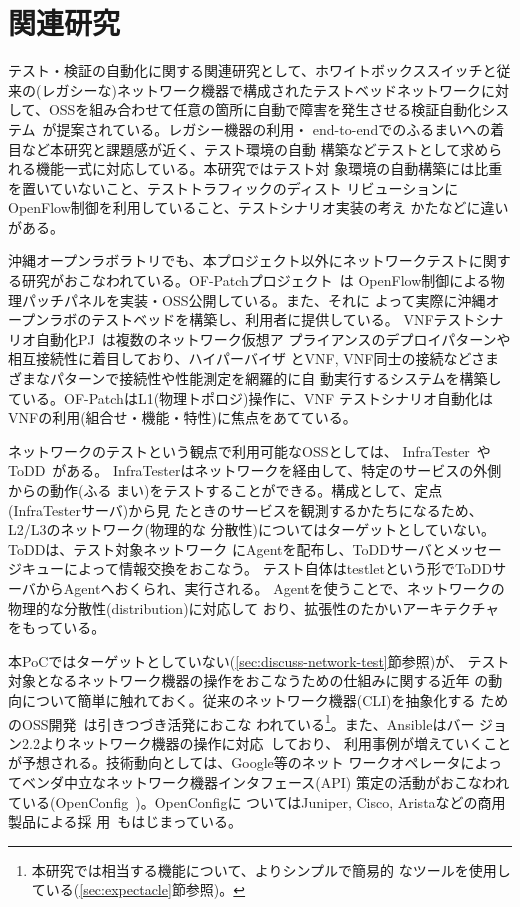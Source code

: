  \section{関連研究}
 \label{sec:related-research}

テスト・検証の自動化に関する関連研究として、ホワイトボックススイッチと従
来の(レガシーな)ネットワーク機器で構成されたテストベッドネットワークに対
して、OSSを組み合わせて任意の箇所に自動で障害を発生させる検証自動化シス
テム~\cite{wbsw-oss-test-automation}が提案されている。レガシー機器の利用・
end-to-endでのふるまいへの着目など本研究と課題感が近く、テスト環境の自動
構築などテストとして求められる機能一式に対応している。本研究ではテスト対
象環境の自動構築には比重を置いていないこと、テストトラフィックのディスト
リビューションにOpenFlow制御を利用していること、テストシナリオ実装の考え
かたなどに違いがある。

沖縄オープンラボラトリでも、本プロジェクト以外にネットワークテストに関す
る研究がおこなわれている。OF-Patchプロジェクト~\cite{ool-testbedpj}は
OpenFlow制御による物理パッチパネルを実装・OSS公開している。また、それに
よって実際に沖縄オープンラボのテストベッドを構築し、利用者に提供している。
VNFテストシナリオ自動化PJ~\cite{ool-vnftestpj}は複数のネットワーク仮想ア
プライアンスのデプロイパターンや相互接続性に着目しており、ハイパーバイザ
とVNF, VNF同士の接続などさまざまなパターンで接続性や性能測定を網羅的に自
動実行するシステムを構築している。OF-PatchはL1(物理トポロジ)操作に、VNF
テストシナリオ自動化はVNFの利用(組合せ・機能・特性)に焦点をあてている。

ネットワークのテストという観点で利用可能なOSSとしては、
InfraTester~\cite{infratester-github}やToDD~\cite{todd-github}がある。
InfraTesterはネットワークを経由して、特定のサービスの外側からの動作(ふる
まい)をテストすることができる。構成として、定点(InfraTesterサーバ)から見
たときのサービスを観測するかたちになるため、L2/L3のネットワーク(物理的な
分散性)についてはターゲットとしていない。ToDDは、テスト対象ネットワーク
にAgentを配布し、ToDDサーバとメッセージキューによって情報交換をおこなう。
テスト自体はtestletという形でToDDサーバからAgentへおくられ、実行される。
Agentを使うことで、ネットワークの物理的な分散性(distribution)に対応して
おり、拡張性のたかいアーキテクチャをもっている。

本PoCではターゲットとしていない(\ref{sec:discuss-network-test}節参照)が、
テスト対象となるネットワーク機器の操作をおこなうための仕組みに関する近年
の動向について簡単に触れておく。従来のネットワーク機器(CLI)を抽象化する
ためのOSS開発~\cite{netmiko-github,napalm-github}は引きつづき活発におこな
われている\footnote{本研究では相当する機能について、よりシンプルで簡易的
なツールを使用している(\ref{sec:expectacle}節参照)。}。また、Ansibleはバー
ジョン2.2よりネットワーク機器の操作に対応~\cite{ansible-22-news}しており、
利用事例が増えていくことが予想される。技術動向としては、Google等のネット
ワークオペレータによってベンダ中立なネットワーク機器インタフェース(API)
策定の活動がおこなわれている(OpenConfig~\cite{openconfig})。OpenConfigに
ついてはJuniper, Cisco, Aristaなどの商用製品による採
用~\cite{openconfig-news}もはじまっている。

